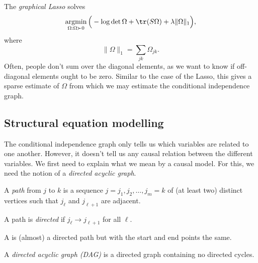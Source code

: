 \documentclass[a4paper]{article}
\DeclareMathOperator*\argmin{argmin}
\begin{document}
The \emph{graphical Lasso} solves
\[
  \argmin_{\Omega: \Omega \succ 0} \Big(-\log \det \Omega + \tr (S \Omega) + \lambda \|\Omega\|_1\Big),
\]
where
\[
  \|\Omega\|_1 = \sum_{jk} \Omega_{jk}.
\]
Often, people don't sum over the diagonal elements, as we want to know if off-diagonal elements ought to be zero. Similar to the case of the Lasso, this gives a sparse estimate of $\Omega$ from which we may estimate the conditional independence graph.

\subsection{Structural equation modelling}
The conditional independence graph only tells us which variables are related to one another. However, it doesn't tell us any causal relation between the different variables. We first need to explain what we mean by a causal model. For this, we need the notion of a \emph{directed acyclic graph}.

\begin{defi}[Path]
  A \emph{path} from $j$ to $k$ is a sequence $j = j_1, j_2, \ldots, j_m = k$ of (at least two) distinct vertices such that $j_\ell$ and $j_{\ell + 1}$ are adjacent.

  A path is \emph{directed} if $j_\ell \to j_{\ell + 1}$ for all $\ell$.
\end{defi}

\begin{defi}
  A  is (almost) a directed path but with the start and end points the same.

  A \emph{directed acyclic graph (DAG)} is a directed graph containing no directed cycles.
\end{defi}

\begin{center}
\end{center}
\end{document}
